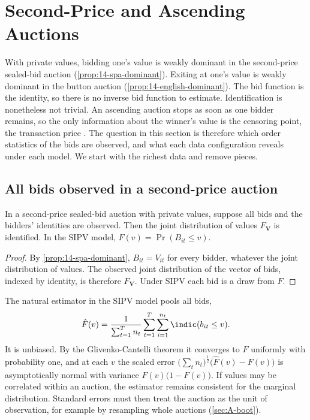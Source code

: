 \section{Second-Price and Ascending Auctions}\label{sec:15-ascending}

With private values, bidding one's value is weakly dominant in the second-price sealed-bid auction
(\cref{prop:14-spa-dominant}). Exiting at one's value is weakly dominant in the button auction
(\cref{prop:14-english-dominant}). The bid function is the identity, so there is no inverse bid function to
estimate. Identification is nonetheless not trivial. An ascending auction stops as soon as one bidder remains, so
the only information about the winner's value is the censoring point, the transaction price
\citep[Section~4.1]{AtheyHaile2007}. The question in this section is therefore which order statistics of the bids
are observed, and what each data configuration reveals under each model. We start with the richest data and remove
pieces.

\subsection{All bids observed in a second-price auction}\label{sec:15-spa-allbids}

\begin{proposition}\label{prop:15-spa-allbids}
In a second-price sealed-bid auction with private values, suppose all bids and the bidders' identities are observed.
Then the joint distribution of values $F_{\bm V}$ is identified. In the SIPV model, $F(v)=\Pr(B_{it}\le v)$.
\end{proposition}

\begin{proof}
By \cref{prop:14-spa-dominant}, $B_{it}=V_{it}$ for every bidder, whatever the joint distribution of values. The
observed joint distribution of the vector of bids, indexed by identity, is therefore $F_{\bm V}$. Under SIPV each
bid is a draw from $F$.
\end{proof}

The natural estimator in the SIPV model pools all bids,
\[
\hat F(v)=\frac{1}{\sum_{t=1}^Tn_t}\sum_{t=1}^T\sum_{i=1}^{n_t}\indic(b_{it}\le v).
\]
It is unbiased. By the Glivenko-Cantelli theorem it converges to $F$ uniformly with probability one, and at each $v$
the scaled error $\big(\sum_tn_t\big)^{\frac12}\big(\hat F(v)-F(v)\big)$ is asymptotically normal with variance
$F(v)\big(1-F(v)\big)$. If values may be correlated within an auction, the estimator remains consistent for the
marginal distribution. Standard errors must then treat the auction as the unit of observation, for example by
resampling whole auctions (\cref{sec:A-boot}).

